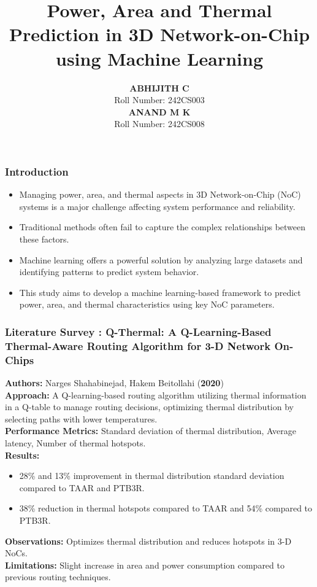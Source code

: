 \documentclass{beamer}
\title{Power, Area and Thermal Prediction in 3D Network-on-Chip using Machine Learning}
\author{
	\textbf{ABHIJITH C} \\ %
	Roll Number: 242CS003 \\ %
	\textbf{ANAND M K} \\ %
	Roll Number: 242CS008 %
}
\institute{
	Department of Computer Science and Engineering \\ 
	National Institute of Technology Karnataka (NITK) \\ 
	Surathkal, India
}
\date{} %
\begin{document}
	
	\frame{\titlepage}
	
\begin{frame}
\frametitle{Introduction}
\begin{itemize}
    \item Managing power, area, and thermal aspects in 3D Network-on-Chip (NoC) systems is a major challenge affecting system performance and reliability.
    \item Traditional methods often fail to capture the complex relationships between these factors.
    \item Machine learning offers a powerful solution by analyzing large datasets and identifying patterns to predict system behavior.
    \item This study aims to develop a machine learning-based framework to predict power, area, and thermal characteristics using key NoC parameters.
\end{itemize}
\end{frame}




\begin{frame}[fragile]
\frametitle{Literature Survey : Q-Thermal: A Q-Learning-Based Thermal-Aware Routing Algorithm for 3-D Network On-Chips}

\textbf{Authors:} Narges Shahabinejad, Hakem Beitollahi (\textbf{2020}) \\
\textbf{Approach:} A Q-learning-based routing algorithm utilizing thermal information in a Q-table to manage routing decisions, optimizing thermal distribution by selecting paths with lower temperatures. \\
\textbf{Performance Metrics:} Standard deviation of thermal distribution, Average latency, Number of thermal hotspots. \\
\textbf{Results:} 
\begin{itemize}
    \item 28\% and 13\% improvement in thermal distribution standard deviation compared to TAAR and PTB3R.
    \item 38\% reduction in thermal hotspots compared to TAAR and 54\% compared to PTB3R.
\end{itemize}
\textbf{Observations:} Optimizes thermal distribution and reduces hotspots in 3-D NoCs. \\
\textbf{Limitations:} Slight increase in area and power consumption compared to previous routing techniques.
\end{frame}
\end{document}
